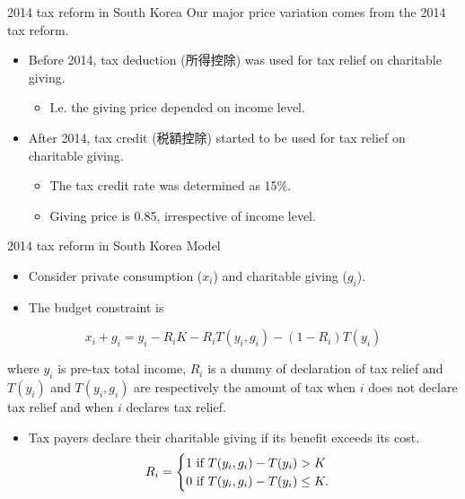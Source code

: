 \documentclass[
  ignorenonframetext,
  aspectratio=169,
]{beamer}
\providecommand{\tightlist}{%
  \setlength{\itemsep}{0pt}\setlength{\parskip}{0pt}}
\begin{document}
\begin{frame}{2014 tax reform in South Korea}
\protect\hypertarget{tax-reform-in-south-korea-1}{}
Our major price variation comes from the 2014 tax reform.

\begin{itemize}
\tightlist
\item
  Before 2014, tax deduction (所得控除) was used for tax relief on charitable giving.

  \begin{itemize}
  \tightlist
  \item
    I.e. the giving price depended on income level.
  \end{itemize}
\item
  After 2014, tax credit (税額控除) started to be used for tax relief on charitable giving.

  \begin{itemize}
  \tightlist
  \item
    The tax credit rate was determined as 15\%.
  \item
    Giving price is 0.85, irrespective of income level.
  \end{itemize}
\end{itemize}
\end{frame}

\begin{frame}{2014 tax reform in South Korea}
\protect\hypertarget{tax-reform-in-south-korea-2}{}
Model

\begin{itemize}
\tightlist
\item
  Consider private consumption (\(x_{i}\)) and charitable giving (\(g_{i}\)).
\item
  The budget constraint is
\end{itemize}

\[x_{i} + g_{i} = y_{i} - R_iK- R_iT(y_{i}, g_{i})-(1-R_i)T(y_i)\]

where \(y_{i}\) is pre-tax total income, \(R_{i}\) is a dummy of declaration of tax relief and \(T(y_i)\) and \(T(y_{i}, g_{i})\) are respectively the amount of tax when \(i\) does not declare tax relief and when \(i\) declares tax relief.

\begin{itemize}
\tightlist
\item
  Tax payers declare their charitable giving if its benefit exceeds its cost.
  \begin{align}
  R_i=\begin{cases}
  1 \text{ if }T(y_i, g_i) - T(y_i)>K\\
  0 \text{ if }T(y_i, g_i) - T(y_i)\le K.\notag
  \end{cases}
  \end{align}
\end{itemize}
\end{frame}
\end{document}
